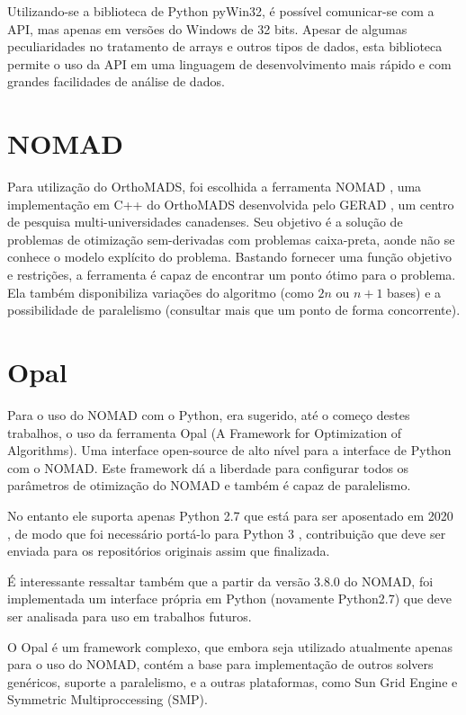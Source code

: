  Utilizando-se a biblioteca de Python pyWin32, é possível comunicar-se com a API, mas apenas em versões do Windows de 32 bits. Apesar de algumas peculiaridades no tratamento de arrays e outros tipos de dados, esta biblioteca permite o uso da API em uma linguagem de desenvolvimento mais rápido\cite{pythonfast} e com grandes facilidades de análise de dados.

\section{NOMAD}
Para utilização do OrthoMADS, foi escolhida a ferramenta NOMAD \cite{Nomad}, uma implementação em C++ do OrthoMADS desenvolvida pelo GERAD \cite{gerad}, um centro de pesquisa multi-universidades canadenses.
%
Seu objetivo é a solução de problemas de otimização sem-derivadas com problemas caixa-preta, aonde não se conhece o modelo explícito do problema.
%
Bastando fornecer uma função objetivo e restrições, a ferramenta é capaz de encontrar um ponto ótimo para o problema.
Ela também disponibiliza variações do algoritmo (como $2n$ ou $n+1$ bases) e a possibilidade de paralelismo (consultar mais que um ponto de forma concorrente).  

	

\section{Opal}
Para o uso do NOMAD com o Python, era sugerido, até o começo destes trabalhos, o uso da ferramenta Opal \cite{opal} (A Framework for Optimization of Algorithms). Uma interface open-source de alto nível para a interface de Python com o NOMAD. Este framework dá a liberdade para configurar todos os parâmetros de otimização do NOMAD e também é capaz de paralelismo.

No entanto ele suporta apenas Python 2.7 que está para ser aposentado em 2020 \cite{python27sched}, de modo que foi necessário portá-lo para Python 3 \cite{opalPython3}, contribuição que deve ser enviada para os repositórios originais assim que finalizada.

É interessante ressaltar também que a partir da versão 3.8.0 do NOMAD, foi implementada um interface própria em Python (novamente Python2.7) que deve ser analisada para uso em trabalhos futuros.

O Opal é um framework complexo, que embora seja utilizado atualmente apenas para o uso do NOMAD, contém a base para implementação de outros solvers genéricos, suporte a paralelismo, e a outras plataformas, como Sun Grid Engine e Symmetric Multiproccessing (SMP).


